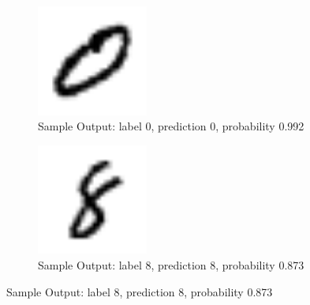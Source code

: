 \begin{figure}[h]
\begin{subfigure}
\centering
\includegraphics[angle=0,width=0.4\textwidth]{assign-2/logs/0.png}
\caption{Sample Output: label 0, prediction 0, probability 0.992}
\end{subfigure}
\begin{subfigure}
\centering
\includegraphics[angle=0,width=0.4\textwidth]{assign-2/logs/8.png}
\caption{Sample Output: label 8, prediction 8, probability 0.873}
\end{subfigure}
\end{figure}